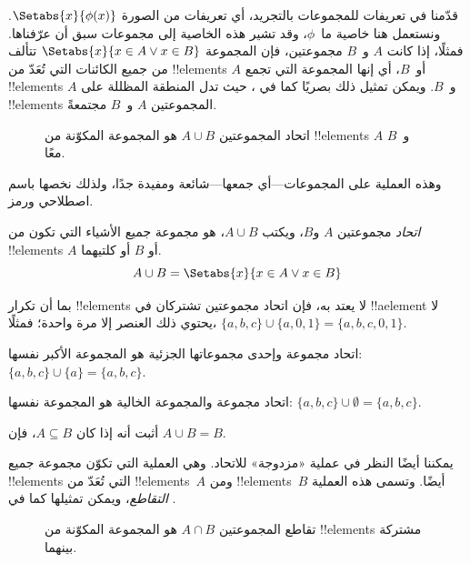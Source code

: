 \documentclass[../../../include/open-logic-section]{subfiles}
\begin{document}

\begin{explain}
قدّمنا في  تعريفات للمجموعات بالتجريد،
أي تعريفات من الصورة $\Setabs{x}{\phi(x)}$. ونستعمل هنا
خاصية ما~$\phi$، وقد تشير هذه الخاصية إلى مجموعات سبق أن عرّفناها.
فمثلًا، إذا كانت $A$ و~$B$ مجموعتين، فإن المجموعة
$\Setabs{x}{x \in A \lor x \in B}$ تتألف من جميع الكائنات التي تُعَدّ من
!!{element}s $A$ أو~$B$، أي إنها المجموعة التي تجمع !!{element}s
$A$ و~$B$. ويمكن تمثيل ذلك بصريًا كما في ، حيث تدل
المنطقة المظللة على !!{element}s المجموعتين $A$ و~$B$ مجتمعةً.

\begin{figure}
  \caption{اتحاد المجموعتين $A \cup B$ هو المجموعة المكوّنة من !!{element}s
   $A$ و~$B$ معًا.}
\end{figure}

وهذه العملية على المجموعات---أي جمعها---شائعة ومفيدة جدًا،
ولذلك نخصها باسم اصطلاحي ورمز.
\end{explain}

\begin{defn}[الاتحاد]
\emph{اتحاد} مجموعتين $A$ و$B$، ويكتب $A \cup B$، هو مجموعة
جميع الأشياء التي تكون من !!{element}s $A$ أو $B$ أو كلتيهما.
\[
A \cup B = \Setabs{x}{x \in A \lor x \in B}
\]
\end{defn}

\begin{ex}
بما أن تكرار !!{element}s لا يعتد به، فإن اتحاد مجموعتين تشتركان في
!!a{element} لا يحتوي ذلك العنصر إلا مرة واحدة؛ فمثلًا،
$\{ a, b, c\} \cup \{ a, 0, 1\} = \{a, b, c, 0, 1\}$.

اتحاد مجموعة وإحدى مجموعاتها الجزئية هو المجموعة الأكبر نفسها: $\{a,
b, c \} \cup \{a \} = \{a, b, c\}$.

اتحاد مجموعة والمجموعة الخالية هو المجموعة نفسها: $\{a,
b, c \} \cup \emptyset = \{a, b, c \}$.
\end{ex}

\begin{prob}
أثبت أنه إذا كان $A \subseteq B$، فإن $A \cup B = B$.
\end{prob}

\begin{explain}
يمكننا أيضًا النظر في عملية «مزدوجة» للاتحاد. وهي العملية التي تكوّن
مجموعة جميع !!{element}s التي تُعَدّ من !!{element}s~$A$ ومن !!{element}s~$B$
أيضًا. وتسمى هذه العملية \emph{التقاطع}، ويمكن تمثيلها كما في
.
\begin{figure}
  \caption{تقاطع المجموعتين $A \cap B$ هو المجموعة المكوّنة من
    !!{element}s مشتركة بينهما.}
\end{figure}
\end{explain}
\end{document}
